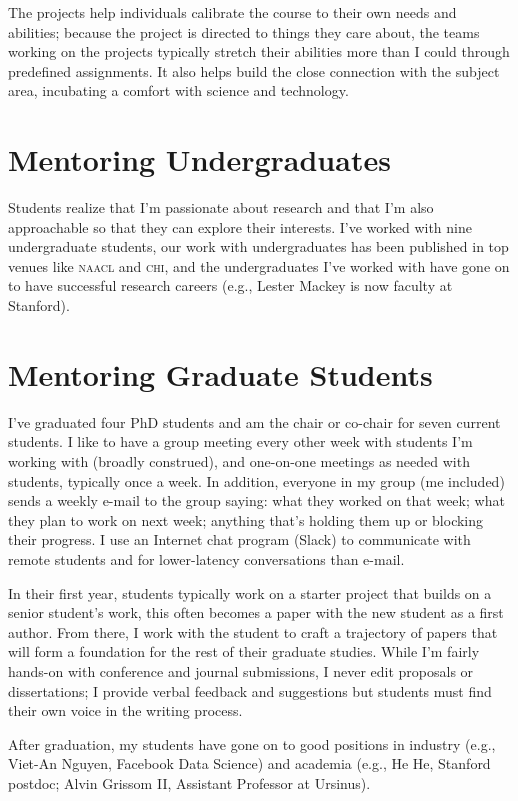 \documentclass[11pt]{amsart}
\newcommand{\abr}[1]{\textsc{#1}}
\begin{document}
The projects help individuals calibrate the course to their own needs
and abilities; because the project is directed to things they
care about, the teams working on the projects typically stretch their
abilities more than I could through predefined assignments.  It also
helps build the close connection with the subject area, incubating a
comfort with science and technology.

\section{Mentoring Undergraduates}

Students realize that I'm passionate about research and that I'm also
approachable so that they can explore their interests.  I've worked
with nine undergraduate students, our work with undergraduates has
been published in top venues like \abr{naacl} and \abr{chi}, and the
undergraduates I've worked with have gone on to have successful
research careers (e.g., Lester Mackey is now faculty at Stanford).

\section{Mentoring Graduate Students}

I've graduated four PhD students and am the chair or co-chair for
seven current students.  I like to have a group meeting every other
week with students I'm working with (broadly construed), and
one-on-one meetings as needed with students, typically once a week. In
addition, everyone in my group (me included) sends a weekly e-mail to
the group saying: what they worked on that week; what they plan to work
on next week; anything that's holding them up or blocking their
progress. I use an Internet chat program (Slack) to communicate with remote
students and for lower-latency conversations than e-mail.

In their first year, students typically work on a starter project that
builds on a senior student's work, this often becomes a paper with the
new student as a first author.  From there, I work with the student to
craft a trajectory of papers that will form a foundation for the rest
of their graduate studies.  While I'm fairly hands-on with conference
and journal submissions, I never edit proposals or dissertations; I
provide verbal feedback and suggestions but students must find their
own voice in the writing process.  

After graduation, my students have gone on to good positions in
industry (e.g., Viet-An Nguyen, Facebook Data Science) and academia
(e.g., He He, Stanford postdoc; Alvin Grissom II, Assistant Professor
at Ursinus).
\end{document}
